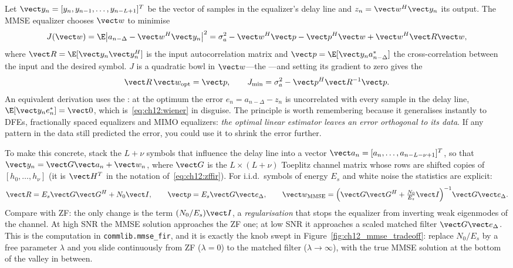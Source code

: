 Let $\vect y_n=[y_n,y_{n-1},\dots,y_{n-L+1}]^T$ be the vector of samples in the equalizer's delay
line and $z_n=\vect w^H\vect y_n$ its output. The MMSE equalizer chooses $\vect w$ to minimise
\begin{equation}
J(\vect w)=\E\big|a_{n-\Delta}-\vect w^H\vect y_n\big|^2
=\sigma_a^2-\vect w^H\vect p-\vect p^H\vect w+\vect w^H\vect R\vect w,
\label{eq:ch12:mse}
\end{equation}
where $\vect R=\E[\vect y_n\vect y_n^H]$ is the input autocorrelation matrix and
$\vect p=\E[\vect y_n a_{n-\Delta}^*]$ the cross-correlation between the input and the desired
symbol. $J$ is a quadratic bowl in $\vect w$---the ---and setting its
gradient to zero gives the 
\begin{equation}
\vect R\,\vect w_{\mathrm{opt}}=\vect p,\qquad J_{\min}=\sigma_a^2-\vect p^H\vect R^{-1}\vect p.
\label{eq:ch12:wiener}
\end{equation}
An equivalent derivation uses the : at the optimum the error
$e_n=a_{n-\Delta}-z_n$ is uncorrelated with every sample in the delay line,
$\E[\vect y_n e_n^*]=\vect 0$, which is~\eqref{eq:ch12:wiener} in disguise. The principle is worth
remembering because it generalises instantly to DFEs, fractionally spaced equalizers and MIMO
equalizers: \emph{the optimal linear estimator leaves an error orthogonal to its data}. If any
pattern in the data still predicted the error, you could use it to shrink the error further.

To make this concrete, stack the $L+\nu$ symbols that influence the delay line into a vector
$\vect a_n=[a_n,\dots,a_{n-L-\nu+1}]^T$, so that $\vect y_n=\vect G\vect a_n+\vect w_n$, where
$\vect G$ is the $L\times(L+\nu)$ Toeplitz channel matrix whose rows are shifted copies of
$[h_0,\dots,h_\nu]$ (it is $\vect H^T$ in the notation of~\eqref{eq:ch12:zffir}). For i.i.d.\ symbols
of energy $E_s$ and white noise the statistics are explicit:
\begin{equation}
\vect R=E_s\vect G\vect G^H+N_0\vect I,\qquad \vect p=E_s\vect G\vect e_\Delta,
\qquad
\vect w_{\mathrm{MMSE}}=\Big(\vect G\vect G^H+\tfrac{N_0}{E_s}\vect I\Big)^{-1}\vect G\vect e_\Delta .
\label{eq:ch12:mmsefir}
\end{equation}
Compare with ZF: the only change is the term $(N_0/E_s)\vect I$, a \emph{regularisation} that
stops the equalizer from inverting weak eigenmodes of the channel. At high SNR the MMSE solution
approaches the ZF one; at low SNR it approaches a scaled matched filter $\vect G\vect e_\Delta$.
This is the computation in \texttt{commlib.mmse\_fir}, and it is exactly the knob swept in
Figure~\ref{fig:ch12_mmse_tradeoff}: replace $N_0/E_s$ by a free parameter $\lambda$ and you slide
continuously from ZF ($\lambda=0$) to the matched filter ($\lambda\to\infty$), with the true MMSE
solution at the bottom of the valley in between.

